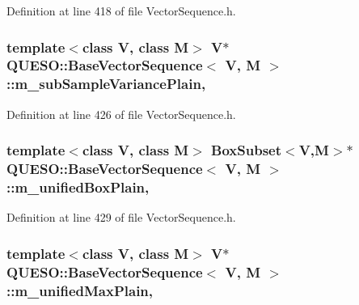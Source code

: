 Definition at line 418 of file Vector\-Sequence.\-h.

\hypertarget{class_q_u_e_s_o_1_1_base_vector_sequence_a25dc9797633cb4b23b7330c5d3de9dd7}{
\subsubsection[{m\-\_\-sub\-Sample\-Variance\-Plain}]{\setlength{\rightskip}{0pt plus 5cm}template$<$class V, class M$>$ V$\ast$ {\bf Q\-U\-E\-S\-O\-::\-Base\-Vector\-Sequence}$<$ V, M $>$\-::m\-\_\-sub\-Sample\-Variance\-Plain\hspace{0.3cm}{\ttfamily [mutable]}, {\ttfamily [protected]}}}\label{class_q_u_e_s_o_1_1_base_vector_sequence_a25dc9797633cb4b23b7330c5d3de9dd7}


Definition at line 426 of file Vector\-Sequence.\-h.

\hypertarget{class_q_u_e_s_o_1_1_base_vector_sequence_a13e15d877a0826605eb62fd65244761a}{
\subsubsection[{m\-\_\-unified\-Box\-Plain}]{\setlength{\rightskip}{0pt plus 5cm}template$<$class V, class M$>$ {\bf Box\-Subset}$<$V,M$>$$\ast$ {\bf Q\-U\-E\-S\-O\-::\-Base\-Vector\-Sequence}$<$ V, M $>$\-::m\-\_\-unified\-Box\-Plain\hspace{0.3cm}{\ttfamily [mutable]}, {\ttfamily [protected]}}}\label{class_q_u_e_s_o_1_1_base_vector_sequence_a13e15d877a0826605eb62fd65244761a}


Definition at line 429 of file Vector\-Sequence.\-h.

\hypertarget{class_q_u_e_s_o_1_1_base_vector_sequence_a5abbf8a1b56ffd00f00a065ff1af1e68}{
\subsubsection[{m\-\_\-unified\-Max\-Plain}]{\setlength{\rightskip}{0pt plus 5cm}template$<$class V, class M$>$ V$\ast$ {\bf Q\-U\-E\-S\-O\-::\-Base\-Vector\-Sequence}$<$ V, M $>$\-::m\-\_\-unified\-Max\-Plain\hspace{0.3cm}{\ttfamily [mutable]}, {\ttfamily [protected]}}}\label{class_q_u_e_s_o_1_1_base_vector_sequence_a5abbf8a1b56ffd00f00a065ff1af1e68}


